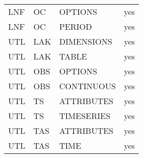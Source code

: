 \begin{longtable}{p{1.5cm} p{1.5cm} p{3cm} c}
\hline
LNF & OC & OPTIONS & yes \\ 
LNF & OC & PERIOD & yes \\ 
\hline
UTL & LAK & DIMENSIONS & yes \\ 
UTL & LAK & TABLE & yes \\ 
\hline
UTL & OBS & OPTIONS & yes \\ 
UTL & OBS & CONTINUOUS & yes \\ 
\hline
UTL & TS & ATTRIBUTES & yes \\ 
UTL & TS & TIMESERIES & yes \\ 
\hline
UTL & TAS & ATTRIBUTES & yes \\ 
UTL & TAS & TIME & yes \\ 


\hline
\end{longtable}
\label{table:blocks}
\normalsize
